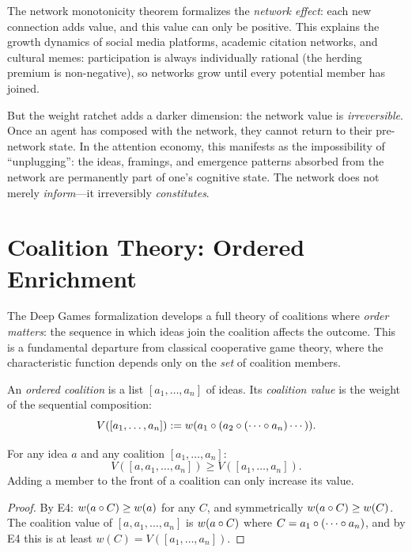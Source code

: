 \begin{interpretation}
The network monotonicity theorem formalizes the \emph{network effect}:
each new connection adds value, and this value can only be positive.
This explains the growth dynamics of social media platforms, academic
citation networks, and cultural memes: participation is always
individually rational (the herding premium is non-negative), so
networks grow until every potential member has joined.

But the weight ratchet adds a darker dimension: the network value is
\emph{irreversible}. Once an agent has composed with the network, they
cannot return to their pre-network state. In the attention economy,
this manifests as the impossibility of ``unplugging'': the ideas,
framings, and emergence patterns absorbed from the network are
permanently part of one's cognitive state. The network does not merely
\emph{inform}---it irreversibly \emph{constitutes}.
\end{interpretation}


\section{Coalition Theory: Ordered Enrichment}

The Deep Games formalization develops a full theory of coalitions where
\emph{order matters}: the sequence in which ideas join the coalition
affects the outcome. This is a fundamental departure from classical
cooperative game theory, where the characteristic function depends
only on the \emph{set} of coalition members.

\begin{definition}
\label{def:ordered-coalition}
An \emph{ordered coalition} is a list $[a_1, \ldots, a_n]$ of ideas.
Its \emph{coalition value} is the weight of the sequential composition:
\[
V([a_1, \ldots, a_n]) := w(a_1 \circ (a_2 \circ (\cdots \circ a_n) \cdots)).
\]
\end{definition}

\begin{theorem}
\label{thm:coalition-enrichment}
For any idea $a$ and any coalition $[a_1, \ldots, a_n]$:
\[
V([a, a_1, \ldots, a_n]) \geq V([a_1, \ldots, a_n]).
\]
Adding a member to the front of a coalition can only increase its value.
\end{theorem}

\begin{proof}
By E4: $w(a \circ C) \geq w(a)$ for any $C$, and symmetrically
$w(a \circ C) \geq w(C)$. The coalition value of $[a, a_1, \ldots, a_n]$
is $w(a \circ C)$ where $C = a_1 \circ (\cdots \circ a_n)$, and
by E4 this is at least $w(C) = V([a_1, \ldots, a_n])$.
\end{proof}

